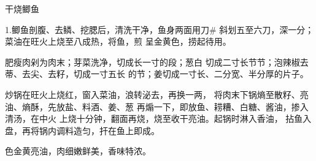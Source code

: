 \begin{recipe}{干烧鲫鱼}

\ingredients



\cooking

 1.鲫鱼剖腹、去鳞、挖腮后，清洗干净，鱼身两面用刀# 斜划五至六刀，深一分；菜油在旺火上烧至八成热，将鱼，煎 呈金黄色，捞起待用。

\step 肥瘦肉剁为肉末；芽菜洗净，切成长一寸的段；葱白 切成二寸长节节；泡辣椒去蒂、去尖、去籽，切成一寸五长 的节；姜切成一寸长、二分宽、半分厚的片子。

炒锅在旺火上烧红，窗入菜油，浪转泌去，再换一两， 将肉末下锅熵至散籽、亮油、熵酥，先放盐、料酒、姜、葱 再煽一下，即放鱼、耢糟、白糖、酱油，掺入清汤，在中火 上烧十分钟，翻面再烧，烧至收干亮油。起锅时淋入香油， 拈鱼入盘，再将锅内调料造匀，扞在鱼上即成。

\notes

色金黄亮油，肉细嫩鲜美，香味特浓。

\end{recipe}

